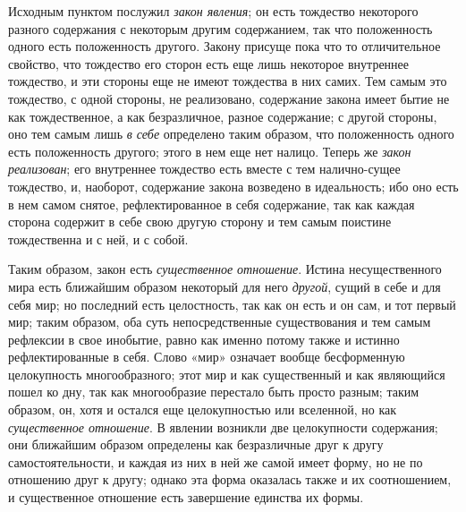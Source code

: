 Исходным пунктом послужил {\em закон явления}; он есть
тождество некоторого разного содержания с некоторым другим содержанием, так
что положенность одного есть положенность другого. Закону присуще пока что
то отличительное свойство, что тождество его сторон есть еще лишь некоторое
внутреннее тождество, и эти стороны еще не имеют тождества в них самих. Тем
самым это тождество, с одной стороны, не реализовано, содержание закона
имеет бытие не как тождественное, а как безразличное, разное содержание; с
другой стороны, оно тем самым лишь {\em в себе}
определено таким образом, что положенность одного есть положенность
другого; этого в нем еще нет налицо. Теперь же
{\em закон реализован}; его внутреннее тождество есть
вместе с тем налично-сущее тождество, и, наоборот, содержание закона
возведено в идеальность; ибо оно есть в нем самом снятое, рефлектированное
в себя содержание, так как каждая сторона содержит в себе свою другую
сторону и тем самым поистине тождественна и с ней, и с собой.

Таким образом, закон есть {\em существенное отношение}.
Истина несущественного мира есть ближайшим образом некоторый для него
{\em другой}, сущий в себе и для себя мир; но последний
есть целостность, так как он есть и он сам, и тот первый мир; таким
образом, оба суть непосредственные существования и тем самым рефлексии в
свое инобытие, равно как именно потому также и истинно рефлектированные в
себя. Слово «мир» означает вообще бесформенную целокупность многообразного;
этот мир и как существенный и как являющийся пошел ко дну, так как
многообразие перестало быть просто разным; таким образом, он, хотя и
остался еще целокупностью или вселенной, но как
{\em существенное отношение}. В явлении возникли две
целокупности содержания; они ближайшим образом определены как безразличные
друг к другу самостоятельности, и каждая из них в ней же самой имеет форму,
но не по отношению друг к другу; однако эта форма оказалась также и их
соотношением, и существенное отношение есть завершение единства их формы.

